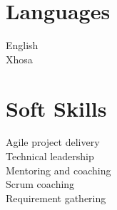 \documentclass[]{deedy-resume-openfont}
\begin{document}
\begin{minipage}[t]{0.33\textwidth}
\section{Languages}
English \\
Xhosa \\
\sectionsep

\section{Soft Skills}
Agile project delivery \\
Technical leadership \\
Mentoring and coaching \\
Scrum coaching \\
Requirement gathering \\
\sectionsep

%
%

\end{minipage} 
\hfill
\end{document}
